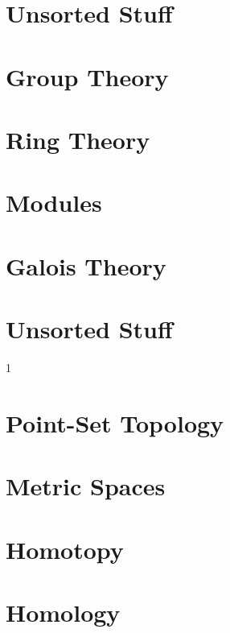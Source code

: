 \documentclass{book}                                                           %
\newcommand*{\TOPPATH}{books}
\newcommand*{\PATH}{\TOPPATH/}
\newcounter{endpage}
\def\compiletopology{1}
\begin{document}
        \part{Unsorted Stuff}
            
            
            
            
            
    \else
        \part{Group Theory}
        \part{Ring Theory}
        \part{Modules}
        \part{Galois Theory}
        \part{Unsorted Stuff}
    \fi
    \clearpage

    \setcounter{endpage}{\thepage}
    \label{book:Topology}%
    \renewcommand{\PATH}{\TOPPATH/Topology}
    \setcounter{page}{\value{endpage}}

    \if\compiletopology1
        \part{Point-Set Topology}
            
            
        \part{Metric Spaces}
        \part{Homotopy}
            
        \part{Homology}
\end{document}
